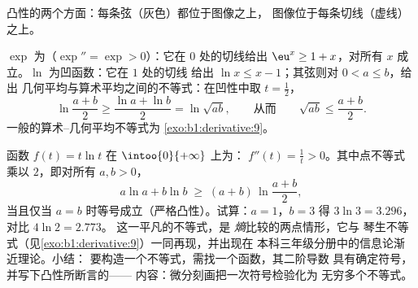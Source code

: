 \begin{omfigure}

{\small 凸性的两个方面：每条弦（灰色）都位于图像之上，
图像位于每条切线（虚线）之上。}
\end{omfigure}

\begin{example}[经典的凸性不等式]\label{ex:b1:derivative:convexineq}
$\exp$ 为（$\exp'' = \exp > 0$）：它在 $0$ 处的切线给出
$\eu^x \geq 1 + x$，对所有 $x$ 成立。$\ln$ 为凹函数：它在 $1$ 处的切线
给出 $\ln x \leq x - 1$；其弦则对 $0 < a \leq b$，给出
几何平均与算术平均之间的不等式：在凹性中取 $t =
\frac12$，
\[
\ln\frac{a + b}{2} \geq \frac{\ln a + \ln b}{2} = \ln\sqrt{ab},
\qquad\text{从而}\qquad
\sqrt{ab} \leq \frac{a+b}{2} .
\]
一般的算术--几何平均不等式为
\cref{exo:b1:derivative:9}。
\end{example}

\begin{example}[从零开始的凸性不等式]\label{ex:b1:derivative:xlnx}
函数 $f(t) = t\ln t$ 在 $\intoo{0}{+\infty}$ 上为：
$f''(t) = \frac1t > 0$。其中点不等式乘以
$2$，即对所有 $a, b > 0$，
\[
a\ln a + b\ln b \;\geq\; (a + b)\,\ln\frac{a + b}{2} ,
\]
当且仅当 $a = b$ 时等号成立（严格凸性）。试算：$a =
1$，$b = 3$ 得 $3\ln 3 = 3.296$，对比 $4\ln 2 = 2.773$。
这一平凡的不等式，是
\emph{熵}比较的两点情形，它与
琴生不等式（见\cref{exo:b1:derivative:9}）一同再现，并出现在
本科三年级分册中的信息论渐近理论。小结：
要构造一个不等式，需找一个函数，其二阶导数
具有确定符号，并写下凸性所断言的——
内容：微分刻画把一次符号检验化为
无穷多个不等式。
\end{example}

